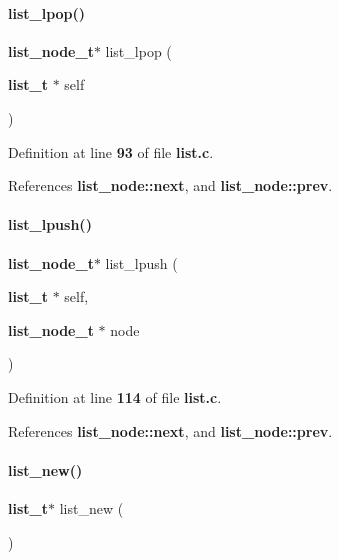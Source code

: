 \mbox{\label{list_8c_a97f6f9590b1cdedd5367b9139e9cc4ef}} 
\paragraph{list\+\_\+lpop()}
{\footnotesize\ttfamily \textbf{ list\+\_\+node\+\_\+t}$\ast$ list\+\_\+lpop (\begin{DoxyParamCaption}\item[{\textbf{ list\+\_\+t} $\ast$}]{self }\end{DoxyParamCaption})}



Definition at line \textbf{ 93} of file \textbf{ list.\+c}.



References \textbf{ list\+\_\+node\+::next}, and \textbf{ list\+\_\+node\+::prev}.

\mbox{\label{list_8c_a7e1b077416813dd474a54826347f7502}} 
\paragraph{list\+\_\+lpush()}
{\footnotesize\ttfamily \textbf{ list\+\_\+node\+\_\+t}$\ast$ list\+\_\+lpush (\begin{DoxyParamCaption}\item[{\textbf{ list\+\_\+t} $\ast$}]{self,  }\item[{\textbf{ list\+\_\+node\+\_\+t} $\ast$}]{node }\end{DoxyParamCaption})}



Definition at line \textbf{ 114} of file \textbf{ list.\+c}.



References \textbf{ list\+\_\+node\+::next}, and \textbf{ list\+\_\+node\+::prev}.

\mbox{\label{list_8c_a9dd3eafdb56dcc64689f78fb4acdff3f}} 
\paragraph{list\+\_\+new()}
{\footnotesize\ttfamily \textbf{ list\+\_\+t}$\ast$ list\+\_\+new (\begin{DoxyParamCaption}{ }\end{DoxyParamCaption})}



